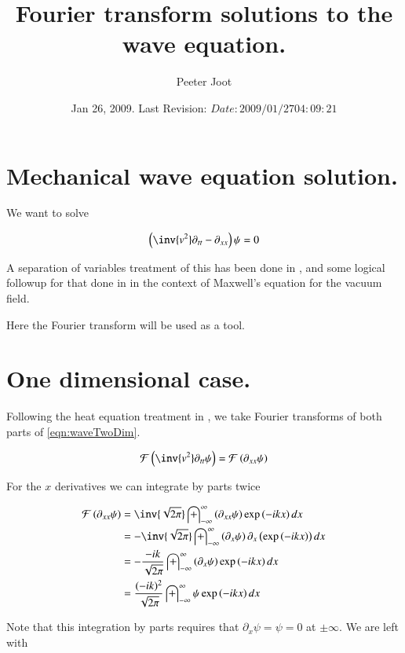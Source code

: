 \documentclass{article}
\title{ Fourier transform solutions to the wave equation. }
\author{Peeter Joot}
\date{ Jan 26, 2009.  Last Revision: $Date: 2009/01/27 04:09:21 $ }
\newcommand{\FF}[0]{\mathcal{F}}
\newcommand{\IIinf}[0]{ \int_{-\infty}^\infty }
\begin{document}
\maketitle{}

\tableofcontents
\section{ Mechanical wave equation solution. }

We want to solve

\begin{align}\label{eqn:waveTwoDim}
\left(\inv{v^2} \partial_{tt} - \partial_{xx}\right) \psi = 0
\end{align}

A separation of variables treatment of this has been done in
\cite{PJwaveFourVector}, and some logical followup for that done in
\cite{PJemWave} in the context of Maxwell's equation for the vacuum field.

Here the Fourier transform will be used as a tool.

\section{ One dimensional case. }

Following the heat equation treatment in \cite{PJheatFourier}, we take Fourier transforms 
of both parts of \ref{eqn:waveTwoDim}.

\begin{align*}
\FF\left( \inv{v^2} \partial_{tt} \psi \right) = \FF\left( \partial_{xx} \psi \right)
\end{align*}

For the $x$ derivatives we can integrate by parts twice

\begin{align*}
\FF\left( \partial_{xx} \psi \right)
&= \inv{\sqrt{2 \pi}} \IIinf \left( \partial_{xx} \psi \right) \exp\left( -i k x \right) dx \\
&= -\inv{\sqrt{2 \pi}} \IIinf \left( \partial_{x} \psi \right) \partial_x\left(\exp\left( -i k x \right) \right) dx \\
&= -\frac{-i k}{\sqrt{2 \pi}} \IIinf \left( \partial_{x} \psi \right) \exp\left( -i k x \right) dx \\
&= \frac{(-i k)^2}{\sqrt{2 \pi}} \IIinf \psi \exp\left( -i k x \right) dx \\
\end{align*}

Note that this integration by parts requires that $\partial_x \psi = \psi = 0$ at $\pm \infty$.  We are left with 
\end{document}
